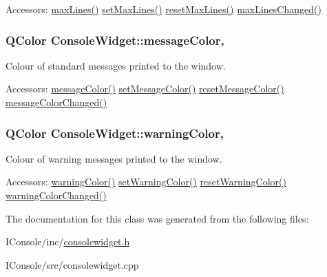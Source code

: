 \begin{DoxyParagraph}{Accessors\-:}
\hyperlink{class_console_widget_afef59d721756f56c09780682aa0e7fac}{max\-Lines()} \hyperlink{class_console_widget_a5bb26af5e53e3025d31b40d8e284feb9}{set\-Max\-Lines()} \hyperlink{class_console_widget_a58291752b182ad84572e36029c42e827}{reset\-Max\-Lines()} \hyperlink{class_console_widget_ad8c0d1aba62d12986b8ec8faeff1a2ae}{max\-Lines\-Changed()} 
\end{DoxyParagraph}
\hypertarget{class_console_widget_a2c801d4bdb2605d0d4fcf2812b0f33fc}{
\subsubsection[{message\-Color}]{\setlength{\rightskip}{0pt plus 5cm}Q\-Color Console\-Widget\-::message\-Color\hspace{0.3cm}{\ttfamily [read]}, {\ttfamily [write]}}}\label{class_console_widget_a2c801d4bdb2605d0d4fcf2812b0f33fc}


Colour of standard messages printed to the window. 

\begin{DoxyParagraph}{Accessors\-:}
\hyperlink{class_console_widget_a2c801d4bdb2605d0d4fcf2812b0f33fc}{message\-Color()} \hyperlink{class_console_widget_a290f1f7d09a6fb2078cada80d6e8024c}{set\-Message\-Color()} \hyperlink{class_console_widget_a899d2b558ccf3976e45514fd4bd9eb7c}{reset\-Message\-Color()} \hyperlink{class_console_widget_a51d0bb1f81c3c8dff9788f5dbf03b569}{message\-Color\-Changed()} 
\end{DoxyParagraph}
\hypertarget{class_console_widget_ac0fe2ed854169ca40a506eef06dd7627}{
\subsubsection[{warning\-Color}]{\setlength{\rightskip}{0pt plus 5cm}Q\-Color Console\-Widget\-::warning\-Color\hspace{0.3cm}{\ttfamily [read]}, {\ttfamily [write]}}}\label{class_console_widget_ac0fe2ed854169ca40a506eef06dd7627}


Colour of warning messages printed to the window. 

\begin{DoxyParagraph}{Accessors\-:}
\hyperlink{class_console_widget_ac0fe2ed854169ca40a506eef06dd7627}{warning\-Color()} \hyperlink{class_console_widget_aaf8789dc58ae736b951552b1fb9cef0d}{set\-Warning\-Color()} \hyperlink{class_console_widget_af089740931bec97455b7858afc0d291c}{reset\-Warning\-Color()} \hyperlink{class_console_widget_a10b823a6b68216c362f75ed01d5fae81}{warning\-Color\-Changed()} 
\end{DoxyParagraph}


The documentation for this class was generated from the following files\-:\begin{DoxyCompactItemize}
\item 
I\-Console/inc/\hyperlink{consolewidget_8h}{consolewidget.\-h}\item 
I\-Console/src/consolewidget.\-cpp\end{DoxyCompactItemize}
